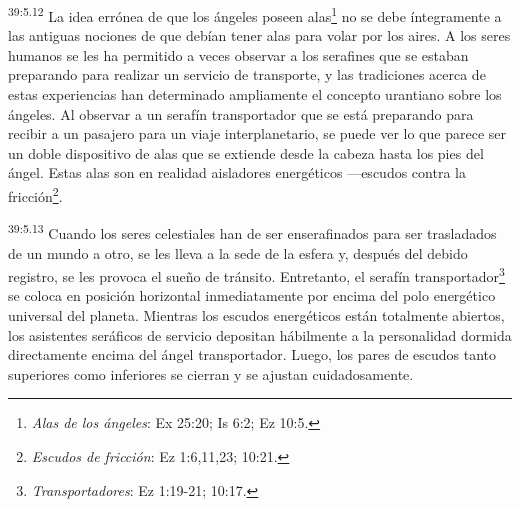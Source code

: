\par
\textsuperscript{39:5.12} La idea errónea de que los ángeles poseen alas\footnote{\textit{Alas de los ángeles}: Ex 25:20; Is 6:2; Ez 10:5.} no se debe íntegramente a las antiguas nociones de que debían tener alas para volar por los aires. A los seres humanos se les ha permitido a veces observar a los serafines que se estaban preparando para realizar un servicio de transporte, y las tradiciones acerca de estas experiencias han determinado ampliamente el concepto urantiano sobre los ángeles. Al observar a un serafín transportador que se está preparando para recibir a un pasajero para un viaje interplanetario, se puede ver lo que parece ser un doble dispositivo de alas que se extiende desde la cabeza hasta los pies del ángel. Estas alas son en realidad aisladores energéticos ---escudos contra la fricción\footnote{\textit{Escudos de fricción}: Ez 1:6,11,23; 10:21.}.

\par
\textsuperscript{39:5.13} Cuando los seres celestiales han de ser enserafinados para ser trasladados de un mundo a otro, se les lleva a la sede de la esfera y, después del debido registro, se les provoca el sueño de tránsito. Entretanto, el serafín transportador\footnote{\textit{Transportadores}: Ez 1:19-21; 10:17.} se coloca en posición horizontal inmediatamente por encima del polo energético universal del planeta. Mientras los escudos energéticos están totalmente abiertos, los asistentes seráficos de servicio depositan hábilmente a la personalidad dormida directamente encima del ángel transportador. Luego, los pares de escudos tanto superiores como inferiores se cierran y se ajustan cuidadosamente.

